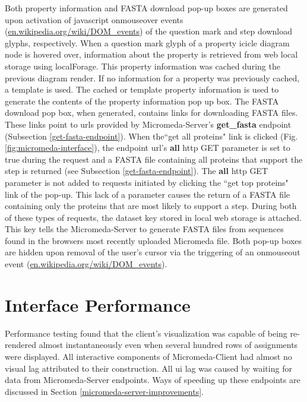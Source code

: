 Both property information and FASTA download pop-up boxes are generated upon 
activation of \gls{javascript} onmouseover events \cite{dom-events} 
(\href{http://en.wikipedia.org/wiki/DOM_events}{en.wikipedia.org/wiki/DOM\_events}) 
of the question mark and step download glyphs, respectively. When a question 
mark glyph of a property icicle diagram node is hovered over, information about 
the property is retrieved from web local storage using localForage. This 
property information was cached during the previous diagram render. If no 
information for a property was previously cached, a template is used. The cached 
or template property information is used to generate the contents of the 
property information pop up box. The FASTA download pop box, when generated, 
contains links for downloading FASTA files. These links point to \gls{url}s 
provided by Micromeda-Server's \textbf{get\_fasta} endpoint (Subsection 
\ref{get-fasta-endpoint}). When the``get all proteins" link is clicked (Fig. 
\ref{fig:micromeda-interface}), the endpoint \gls{url}'s \textbf{all} \gls{http} 
GET parameter is set to true during the request and a FASTA file containing all 
proteins that support the step is returned (see Subsection 
\ref{get-fasta-endpoint}). The \textbf{all} \gls{http} GET parameter is not 
added to requests initiated by clicking the ``get top proteins" link of the 
pop-up. This lack of a parameter causes the return of a FASTA file containing 
only the proteins that are most likely to support a step. During both of these 
types of requests, the dataset key stored in local web storage is attached. This 
key tells the Micromeda-Server to generate FASTA files from sequences found in 
the browsers most recently uploaded Micromeda file. Both pop-up boxes are hidden 
upon removal of the user's cursor via the triggering of an onmouseout event 
\cite{dom-events} 
(\href{http://en.wikipedia.org/wiki/DOM_events}{en.wikipedia.org/wiki/DOM\_events}).

\section{Interface Performance}

Performance testing found that the client's visualization was capable of being 
re-rendered almost instantaneously even when several hundred rows of assignments 
were displayed. All interactive components of Micromeda-Client had almost no 
visual lag attributed to their construction. All \gls{ui} lag was caused by 
waiting for data from Micromeda-Server endpoints. Ways of speeding up these 
endpoints are discussed in Section \ref{micromeda-server-improvements}.

